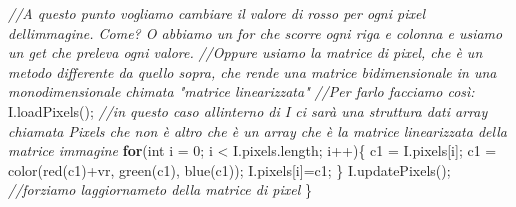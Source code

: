 \documentclass[
]{article}
\newenvironment{Shaded}{}{}
\newcommand{\CommentTok}[1]{\textcolor[rgb]{0.38,0.63,0.69}{\textit{#1}}}
\newcommand{\ControlFlowTok}[1]{\textcolor[rgb]{0.00,0.44,0.13}{\textbf{#1}}}
\newcommand{\DataTypeTok}[1]{\textcolor[rgb]{0.56,0.13,0.00}{#1}}
\newcommand{\DecValTok}[1]{\textcolor[rgb]{0.25,0.63,0.44}{#1}}
\newcommand{\FunctionTok}[1]{\textcolor[rgb]{0.02,0.16,0.49}{#1}}
\newcommand{\NormalTok}[1]{#1}
\newcommand{\OperatorTok}[1]{\textcolor[rgb]{0.40,0.40,0.40}{#1}}
\begin{document}
\begin{Shaded}
\begin{Highlighting}[]
  \CommentTok{//A questo punto vogliamo cambiare il valore di rosso per ogni pixel dell\textquotesingle{}immagine. Come? O abbiamo un for che scorre ogni riga e colonna e usiamo un get che preleva ogni valore.}
  \CommentTok{//Oppure usiamo la matrice di pixel, che è un metodo differente da quello sopra, che rende una matrice bidimensionale in una monodimensionale chimata "matrice linearizzata"}
  \CommentTok{//Per farlo facciamo così:}
\NormalTok{  I}\OperatorTok{.}\FunctionTok{loadPixels}\OperatorTok{();} \CommentTok{//in questo caso all\textquotesingle{}interno di I ci sarà una struttura dati array chiamata Pixels che non è altro che è un array che è la matrice linearizzata della matrice immagine}
  \ControlFlowTok{for}\OperatorTok{(}\DataTypeTok{int}\NormalTok{ i }\OperatorTok{=} \DecValTok{0}\OperatorTok{;}\NormalTok{ i }\OperatorTok{\textless{}}\NormalTok{ I}\OperatorTok{.}\FunctionTok{pixels}\OperatorTok{.}\FunctionTok{length}\OperatorTok{;}\NormalTok{ i}\OperatorTok{++)\{}
\NormalTok{    c1 }\OperatorTok{=}\NormalTok{ I}\OperatorTok{.}\FunctionTok{pixels}\OperatorTok{[}\NormalTok{i}\OperatorTok{];}
\NormalTok{    c1 }\OperatorTok{=} \FunctionTok{color}\OperatorTok{(}\FunctionTok{red}\OperatorTok{(}\NormalTok{c1}\OperatorTok{)+}\NormalTok{vr}\OperatorTok{,} \FunctionTok{green}\OperatorTok{(}\NormalTok{c1}\OperatorTok{),} \FunctionTok{blue}\OperatorTok{(}\NormalTok{c1}\OperatorTok{));}
\NormalTok{    I}\OperatorTok{.}\FunctionTok{pixels}\OperatorTok{[}\NormalTok{i}\OperatorTok{]=}\NormalTok{c1}\OperatorTok{;}
  \OperatorTok{\}}
\NormalTok{  I}\OperatorTok{.}\FunctionTok{updatePixels}\OperatorTok{();} \CommentTok{//forziamo l\textquotesingle{}aggiornameto della matrice di pixel  }
\OperatorTok{\}}
\end{Highlighting}
\end{Shaded}
\end{document}
